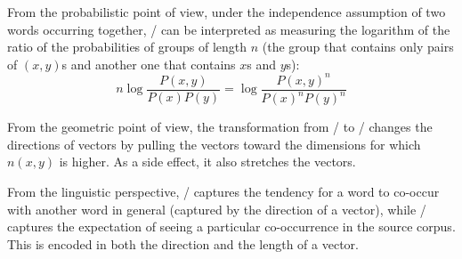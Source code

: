 From the probabilistic point of view, under the independence assumption of two words occurring together, \NPMI/ can be interpreted as measuring the logarithm of the ratio of the probabilities of groups of length $n$ (the group that contains only pairs of $(x,y)$s and another one that contains $x$s and $y$s):
%
\begin{equation}
  n\log\frac{P(x, y)}{P(x)P(y)} = \log\frac{P(x, y)^{n}}{P(x)^{n}P(y)^{n}}
\end{equation}
%
%
%

From the geometric point of view, the transformation from \PMI/ to \NPMI/ changes the directions of vectors by pulling the vectors toward the dimensions for which $n(x, y)$ is higher. As a side effect, it also stretches the vectors.%

From the linguistic perspective, \PMI/ captures the tendency for a word to co-occur with another word in general (captured by the direction of a vector), while \NPMI/ captures the expectation of seeing a particular co-occurrence in the source corpus. This is encoded in both the direction and the length of a vector.



